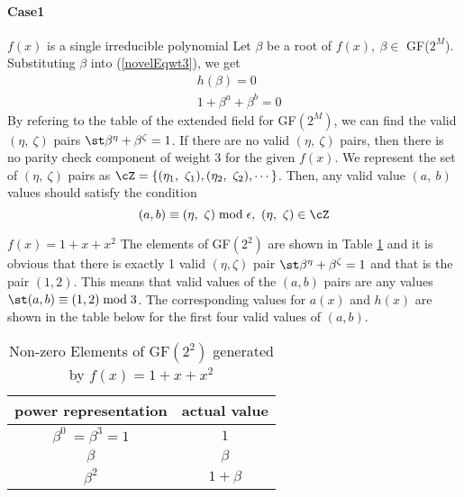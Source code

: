 \paragraph{ Case1} $f(x)$ is a single irreducible polynomial \newline
Let $\beta$  be a root of $f(x),~\beta \in $ GF($2^M$). Substituting $\beta$ into (\ref{novelEqwt3}), we get 
\begin{equation}
\begin{split}
&h(\beta)=0\\
&1+\beta^a+\beta^b=0
\end{split}
\label{novelEqwt3-1}
\end{equation}
By refering to the table of the extended field for GF$(2^M)$, we can find the valid $(\eta,~\zeta)$ pairs $\st \beta^{\eta}+\beta^{\zeta}=1$. If there are no valid $(\eta,~\zeta)$ pairs, then there is no parity check component of weight $3$ for the given $f(x)$.
 We represent the set of $(\eta,~\zeta)$ pairs as 
$\cZ=\{ (\eta_1,~\zeta_1) ,( \eta_2,~\zeta_2),\cdots\}$. Then, any valid value $(a,~b)$ values should satisfy the condition
\begin{equation}
(a,b) \equiv (\eta,~\zeta) \bmod \epsilon,~(\eta,~\zeta)\in \cZ
\end{equation}
\begin{example}
$f(x)=1+x+x^2$ \newline
The elements of GF$(2^2)$ are shown in Table \ref{novelTab7} and it is obvious that there is exactly 1 valid $(\eta,\zeta)$ pair $\st \beta^{\eta}+\beta^{\zeta} = 1$ and that is the pair $(1,2)$.
This means that valid values of the $(a,b)$ pairs are any values $\st (a,b) \equiv (1,2) \bmod 3$.  The corresponding values for $a(x)$ and $h(x)$ are shown in the table below for the first four valid values of $(a,b)$.
\end{example}

 \begin{table}[htbp]
 \caption{Non-zero Elements of GF$(2^2)$ generated by $f(x)=1+x+x^2$}
\centering
 \begin{tabular}{c c} 
 \hline
 power representation & actual value \\ [0.5ex] 
 \hline\hline
$\beta^0~=\beta^3=1$ & $1$\\
\hline
$\beta$ & $\beta$\\
\hline
$\beta^2$ &  $1+\beta$\\
\hline
 \end{tabular}
 \label{novelTab7}
\end{table}

